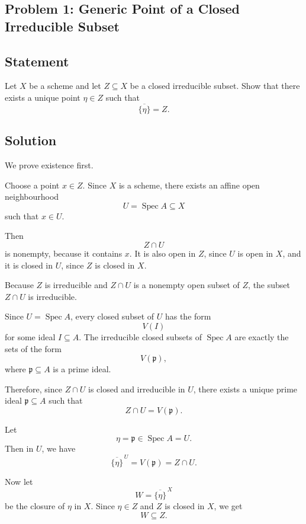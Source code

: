 
\subsection*{Problem 1: Generic Point of a Closed Irreducible Subset}

\subsection*{Statement}

Let \(X\) be a scheme and let \(Z\subseteq X\) be a closed irreducible subset. Show that there exists a unique point \(\eta\in Z\) such that
\[
\overline{\{\eta\}}=Z.
\]

\subsection*{Solution}

We prove existence first.

Choose a point \(x\in Z\). Since \(X\) is a scheme, there exists an affine open neighbourhood
\[
U=\operatorname{Spec} A\subseteq X
\]
such that \(x\in U\).

Then
\[
Z\cap U
\]
is nonempty, because it contains \(x\). It is also open in \(Z\), since \(U\) is open in \(X\), and it is closed in \(U\), since \(Z\) is closed in \(X\).

Because \(Z\) is irreducible and \(Z\cap U\) is a nonempty open subset of \(Z\), the subset \(Z\cap U\) is irreducible.

Since \(U=\operatorname{Spec} A\), every closed subset of \(U\) has the form
\[
V(I)
\]
for some ideal \(I\subseteq A\). The irreducible closed subsets of \(\operatorname{Spec} A\) are exactly the sets of the form
\[
V(\mathfrak p),
\]
where \(\mathfrak p\subseteq A\) is a prime ideal.

Therefore, since \(Z\cap U\) is closed and irreducible in \(U\), there exists a unique prime ideal \(\mathfrak p\subseteq A\) such that
\[
Z\cap U=V(\mathfrak p).
\]

Let
\[
\eta=\mathfrak p\in \operatorname{Spec} A=U.
\]
Then in \(U\), we have
\[
\overline{\{\eta\}}^{\,U}=V(\mathfrak p)=Z\cap U.
\]

Now let
\[
W=\overline{\{\eta\}}^{\,X}
\]
be the closure of \(\eta\) in \(X\). Since \(\eta\in Z\) and \(Z\) is closed in \(X\), we get
\[
W\subseteq Z.
\]

